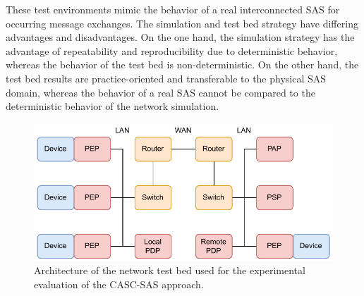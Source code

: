 These test environments mimic the behavior of a real interconnected SAS for occurring message exchanges.
The simulation and test bed strategy have differing advantages and disadvantages.
On the one hand, the simulation strategy has the advantage of repeatability and reproducibility due to deterministic behavior, whereas the behavior of the test bed is non-deterministic.
On the other hand, the test bed results are practice-oriented and transferable to the physical SAS domain, whereas the behavior of a real SAS cannot be compared to the deterministic behavior of the network simulation.
\begin{figure}
    \centering
    \includegraphics[width=1.0\linewidth]{figures/network_testbed_color.drawio.pdf}
    \caption{Architecture of the network test bed used for the experimental evaluation of the CASC-SAS approach.
    }
    \label{fig:evaluation_test_bed}
\end{figure}

